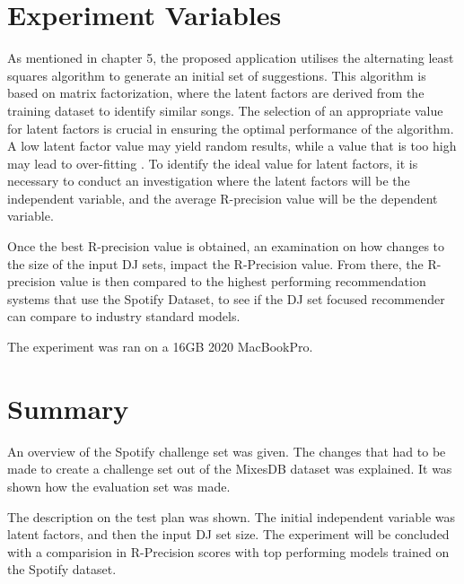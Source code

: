\section{Experiment Variables}

As mentioned in chapter 5, the proposed application utilises the alternating least squares algorithm to generate an initial set of suggestions. This algorithm is based on matrix factorization, where the latent factors are derived from the training dataset to identify similar songs. The selection of an appropriate value for latent factors is crucial in ensuring the optimal performance of the algorithm. A low latent factor value may yield random results, while a value that is too high may lead to over-fitting \citep{zhou_large-scale_2008}. To identify the ideal value for latent factors, it is necessary to conduct an  investigation where the latent factors will be the independent variable, and the average R-precision value will be the dependent variable. 

Once the best R-precision value is obtained, an examination on how changes to the size of the input DJ sets, impact the R-Precision value. From there, the R-precision value is then compared to the highest performing recommendation systems that use the Spotify Dataset, to see if the DJ set focused recommender can compare to industry standard models.

The experiment was ran on a 16GB 2020 MacBookPro.

\section{Summary}
An overview of the Spotify challenge set was given. The changes that had to be made to create a challenge set out of the MixesDB dataset was explained. It was  shown how the evaluation set was made. 

The description on the test plan was shown. The initial independent variable was latent factors, and then the input DJ set size. The experiment will be concluded with a comparision in R-Precision scores with top performing models trained on the Spotify dataset.

